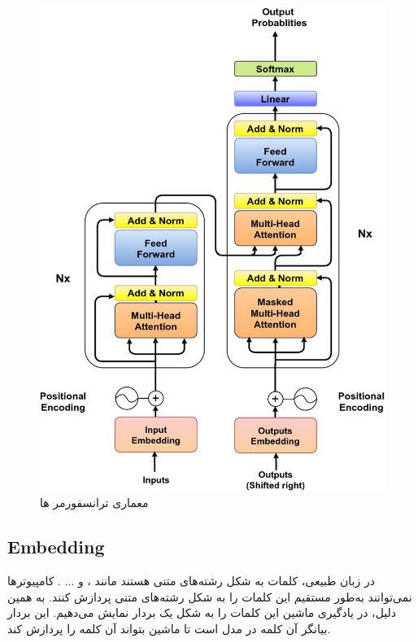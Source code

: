  
 \begin{figure}[h]
 	\centering
 	\begin{minipage}[b]{0.45\textwidth}
 		\centering
 		\includegraphics[width=\textwidth]{Transformer-model-architecture.png}
 		\caption{معماری ترانسفورمر ها}
 		\label{fig:transformer_architecture}
 	\end{minipage}
 	\hfill

 \end{figure}

\subsection{Embedding}
در زبان طبیعی، کلمات به شکل رشته‌های متنی هستند مانند ،  و ... . کامپیوترها نمی‌توانند به‌طور مستقیم این کلمات را به شکل رشته‌های متنی پردازش کنند. به همین دلیل، در یادگیری ماشین این کلمات را به شکل یک بردار نمایش می‌دهیم. این بردار بیانگر آن کلمه در مدل است تا ماشین بتواند آن کلمه را پردازش کند.

